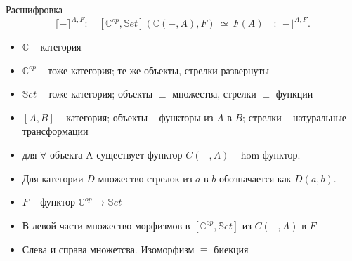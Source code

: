 \documentclass[
  russian,
  aspectratio=169,
  xcolor={svgnames},
  hyperref={colorlinks,citecolor=DeepPink4}]{beamer}
\begin{document}
\begin{frame}[fragile]{Расшифровка}
$$
\lceil- \rceil^{A, F} :\quad
[\mathbb{C}^{op}, \mathbb{S}et](\mathbb{C}(-,A), F) \ \simeq\  F(A)
\quad:\lfloor-\rfloor^{A, F}.
$$
\begin{minipage}{0.5\textwidth}
\begin{itemize}
  \item $\mathbb{C}$ -- категория
  \item $\mathbb{C}^{op}$ -- тоже категория; те же объекты, стрелки развернуты
  \item $\mathbb{S}et$ -- тоже категория; объекты $\equiv$ множества, стрелки $\equiv$ функции
  \item $[A,B]$ -- категория; объекты -- функторы из $A$ в $B$; стрелки -- натуральные трансформации
  \item для $\forall$ объекта A существует функтор $C(-,A)$ -- hom функтор.
  \item Для категории $D$
  множество стрелок из $a$ в $b$ обозначается как $D(a,b)$.
\end{itemize}
\end{minipage}
\begin{minipage}{0.4\textwidth}
\begin{itemize}
  \item $F$ -- функтор $\mathbb{C}^{op}\rightarrow\mathbb{S}et$
  \item В левой части множество морфизмов в $[\mathbb{C}^{op}, \mathbb{S}et]$ из $C(-,A)$ в $F$
  \item Слева и справа множетсва. Изоморфизм $\equiv$ биекция
\end{itemize}
\end{minipage}

\end{frame}
\end{document}
